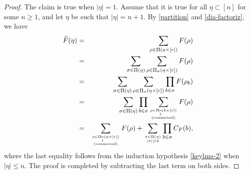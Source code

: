 \documentclass[bj,authoryear,noshowframe]{imsart}
\theoremstyle{plain}
\theoremstyle{remark}
\newcommand{\E}{\mathbb{E}}
\newtheorem{remark}[prop]{Remark}
\begin{document}
\begin{proof}
The claim is true when $|\eta |=1$. %
Assume that it is true for all $\eta \subset [n]$ for some $n \geq 1$, and 
 let $\eta$ be such that $|\eta |=n+1$.
 By \eqref{partition} and \eqref{dia-factoriz}, we have 
\begin{eqnarray*}
  \widehat{F}(\eta )
  &=&
  \sum_{\rho \in \Pi (\eta \times [r])} F(\rho )
  \\
  &=&
  \sum_{\sigma \in \Pi (\eta )}
  \sum_{\rho \in \Pi_\sigma (\eta \times [r])} F(\rho )
  \\
  &=&
  \sum_{\sigma \in \Pi (\eta )}
  \sum_{\rho \in \Pi_\sigma (\eta \times [r])}
  \prod_{b \in \sigma} 
  F(\rho_b ) 
 \\
  &=&
  \sum_{\sigma \in \Pi (\eta )}
  \prod_{b \in \sigma } 
  \sum_{\rho \in \Pi_{\widehat{1}} (b \times [r])
    \atop {\rm (connected)}
  } 
  F(\rho )
 \\
  &=&
 \sum_{\rho \in \Pi_{\widehat{1}} ( \eta \times [r] )
   \atop {\rm (connected)}
 }
  F(\rho )
  +
  \sum_{\sigma \in \Pi (\eta ) \atop |\sigma |\geq 2}
  \prod_{b \in \sigma } 
  C_F (b ), 
\end{eqnarray*}
where the last equality follows from the induction hypothesis \eqref{keylma-2} 
when $| \eta |\leq n$.
 The proof is completed by subtracting the last term on both sides. 
\end{proof}
\end{document}
